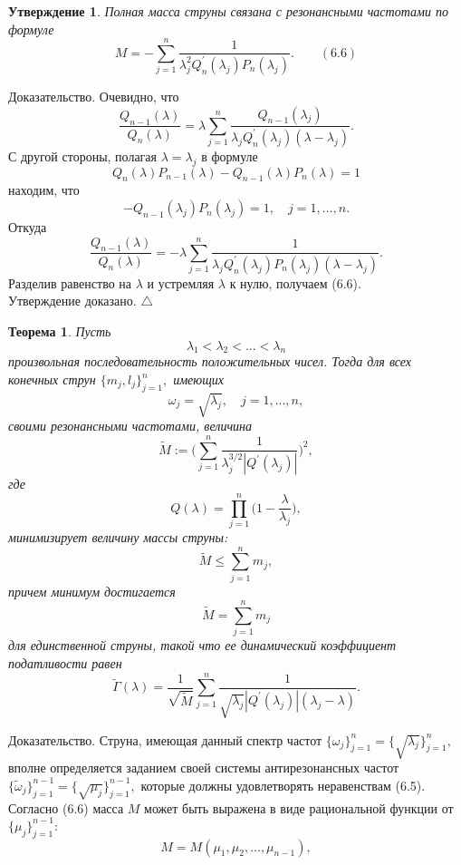 \documentclass[12pt,a4paper]{article}
\theoremstyle{plain}   \newtheorem{Pro}{Задача}
\newtheorem{Sta}{Утверждение}
\newtheorem{The}{Теорема}
\begin{document}
\begin{Sta}
Полная масса струны связана с резонансными частотами
по формуле
$$
  M=-\sum _{j=1}^n \frac{1}
    {\lambda _j ^2 Q_n ^{\prime}(\lambda _j )
	  P_n (\lambda _j )}.
	    \qquad (6.6)
$$
\end{Sta}
{\Large Доказательство.}
Очевидно, что
$$
  \frac{Q_{n-1}(\lambda )}{Q_n (\lambda )}=
    \lambda \sum _{j=1}^n \frac{Q_{n-1}(\lambda _j )}
	  {\lambda _j Q_n ^{\prime}(\lambda _j ) (\lambda -\lambda _j )}.
$$
С другой стороны, полагая
$ \lambda = \lambda _j $
в формуле
$$
  Q_n (\lambda )P_{n-1}(\lambda )-
    Q_{n-1}(\lambda )P_n (\lambda ) =1
$$
находим, что
$$
  -Q_{n-1}(\lambda _j )P_n (\lambda _j )=1,
    \quad j=1,...,n.
$$
Откуда
$$
  \frac{Q_{n-1}(\lambda )}{Q_n (\lambda )}=-\lambda
    \sum _{j=1}^n \frac{1}
	  {\lambda _j Q_n ^{\prime}(\lambda _j )
	    P_n (\lambda _j )(\lambda -\lambda _j )}.
$$
Разделив равенство на
$ \lambda $
и устремляя
$ \lambda $
к нулю, получаем (6.6). \\
Утверждение доказано.
$ \triangle $
\begin{The}
Пусть
$$
  \lambda _1 < \lambda _2 < ...<\lambda _n
$$
произвольная последовательность положительных чисел.
Тогда для всех конечных струн
$ \{ m_j , l_j \} _{j=1}^n , $
имеющих
$$
  \omega _j =\sqrt{\lambda _j},
    \quad j=1,...,n,
$$
своими резонансными частотами, величина
$$
  \tilde M := \Biggl (
    \sum _{j=1}^n \frac{1}
	  {\lambda _j ^{3/2} |Q^{\prime}(\lambda _j ) | }
	    \Biggr ) ^2 ,
$$
где
$$
  Q(\lambda )=\prod _{j=1}^n \biggl ( 1-
    \frac{\lambda}{\lambda _j} \biggr ) ,
$$
минимизирует величину массы струны:
$$
  \tilde M \leqslant \sum _{j=1}^n m_j ,
$$
причем минимум достигается
$$
  \tilde M = \sum _{j=1}^n m_j
$$
для единственной струны, такой что ее динамический
коэффициент податливости равен
$$
  \tilde \Gamma (\lambda )=
    \frac{1}{\sqrt{\tilde M }} \sum _{j=1}^n
	  \frac{1}{\sqrt{\lambda _j}
	    |Q^{\prime}(\lambda _j ) | (\lambda _j -\lambda )}.
$$
\end{The}
{\Large Доказательство.}
Струна, имеющая данный спектр частот
$ \{ \omega _j \} _{j=1}^n =\{ \sqrt{\lambda _j} \} _{j=1}^n , $
вполне определяется заданием своей системы антирезонансных частот
$ \{ \tilde \omega _j \} _{j=1}^{n-1}=\{ \sqrt{\mu _j} \} _{j=1}^{n-1} , $
которые должны удовлетворять неравенствам (6.5).
Согласно (6.6) масса
$ M $
может быть выражена в виде рациональной функции от
$ \{ \mu _j \} _{j=1}^{n-1} : $
$$
  M=M(\mu _1 , \mu _2 ,...,\mu _{n-1}),
$$
\end{document}
